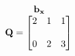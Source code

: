 \documentclass[preview]{standalone}
\begin{document}
\begin{align*}
\begin{array}{c}\begin{matrix}\hspace{1cm} \mathbf{b_{x}}  \quad \hspace{0.6cm} \end{matrix} \\ \mathbf{Q} = \begin{bmatrix} 2 & 1 & 1 \\ \\ 0 & 2 & 3 \end{bmatrix} \end{array}
\end{align*}
\end{document}
